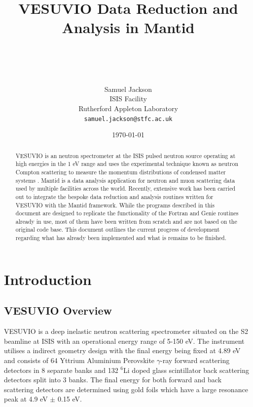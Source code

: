 \documentclass[paper=a4, fontsize=11pt]{scrartcl}	%
\title{ \vspace{-1in} 	\usefont{OT1}{bch}{b}{n}
		\huge \strut VESUVIO Data Reduction and Analysis in Mantid \strut \\
}
\author{ 									\usefont{OT1}{bch}{m}{n}
        Samuel Jackson\\		\usefont{OT1}{bch}{m}{n}
        ISIS Facility\\	\usefont{OT1}{bch}{m}{n}
        Rutherford Appleton Laboratory\\
        \texttt{samuel.jackson@stfc.ac.uk}
}
\date{\today}
\numberwithin{equation}{section}															%
\numberwithin{figure}{section}																%
\numberwithin{table}{section}
\begin{document}
\maketitle
\clearpage
\tableofcontents
\clearpage
\begin{abstract}
VESUVIO is an neutron spectrometer at the ISIS pulsed neutron source operating at high energies in the 1 eV range and uses the experimental technique known as neutron Compton scattering to measure the momentum distributions of condensed matter systems \citep{mayers2012vesuvio}. Mantid \citep{mantid} is a data analysis application for neutron and muon scattering data used by multiple facilities across the world. Recently, extensive work has been carried out to integrate the bespoke data reduction and analysis routines written for VESUVIO with the Mantid framework. While the programs described in this document are designed to replicate the functionality of the Fortran and Genie routines already in use, most of them have been written from scratch and are not based on the original code base. This document outlines the current progress of development regarding what has already been implemented and what is remains to be finished.
\end{abstract}

\section{Introduction}
\label{sec:introduction}
\subsection{VESUVIO Overview}
\label{subsec:VESUVIO-overview}
VESUVIO is a deep inelastic neutron scattering spectrometer situated on the S2 beamline at ISIS with an operational energy range of 5-150 eV. The instrument utilises a indirect geometry design with the final energy being fixed at 4.89 eV \cite{mayers2011calibration} and consists of 64 Yttrium Aluminium Perovskite $\gamma$-ray forward scattering detectors in 8 separate banks and 132 $^6$Li doped glass scintillator back scattering detectors split into 3 banks. The final energy for both forward and back scattering detectors are determined using gold foils which have a large resonance peak at 4.9 eV $\pm$ 0.15 eV. 
\end{document}
